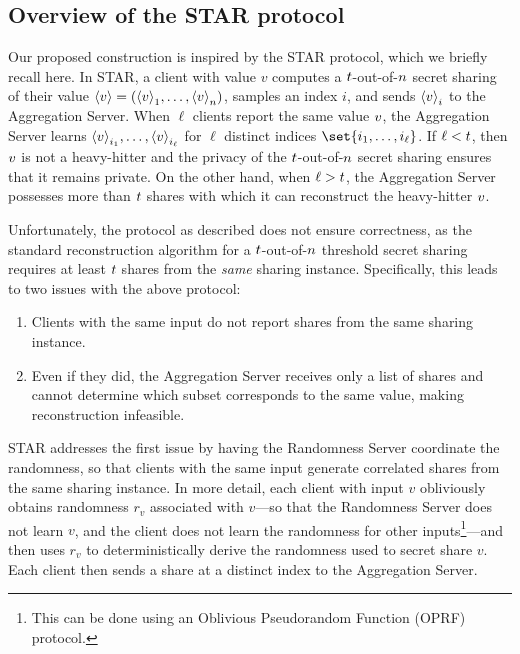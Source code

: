 \subsection{Overview of the STAR protocol}
\label{subsec-STAR}
Our proposed construction is inspired by the STAR protocol, which we briefly recall here.
In STAR, a client with value $v$ computes a $t$-out-of-$n$ secret sharing of their value ${\langle v \rangle} = ({\langle v \rangle}_{1}, \ldots, {\langle v \rangle}_{n})$, samples an index $i$, and sends ${\langle v \rangle}_{i}$ to the Aggregation Server.
When $\ell$ clients report the same value $v$, the Aggregation Server learns ${\langle v \rangle}_{i_1}, \ldots, {\langle v \rangle}_{i_\ell}$ for $\ell$ distinct indices $\set{i_1, \ldots, i_\ell}$.
If $\ell < t$, then $v$ is not a heavy-hitter and the privacy of the $t$-out-of-$n$ secret sharing ensures that it remains private.
On the other hand, when $\ell > t$, the Aggregation Server possesses more than $t$ shares with which it can reconstruct the heavy-hitter $v$.

Unfortunately, the protocol as described does not ensure correctness, as the standard reconstruction algorithm for a $t$-out-of-$n$ threshold secret sharing requires at least $t$ shares from the \emph{same} sharing instance.
Specifically, this leads to two issues with the above protocol:
\begin{enumerate}
	\item Clients with the same input do not report shares from the same sharing instance.
	\item Even if they did, the Aggregation Server receives only a list of shares and cannot determine which subset corresponds to the same value, making reconstruction infeasible.
\end{enumerate}
STAR addresses the first issue by having the Randomness Server coordinate the randomness, so that clients with the same input generate correlated shares from the same sharing instance.
In more detail, each client with input $v$ obliviously obtains randomness $r_v$ associated with $v$---so that the Randomness Server does not learn $v$, and the client does not learn the randomness for other inputs\footnote{This can be done using an Oblivious Pseudorandom Function (OPRF) protocol.}---and then uses $r_v$ to deterministically derive the randomness used to secret share $v$.
Each client then sends a share at a distinct index to the Aggregation Server.

